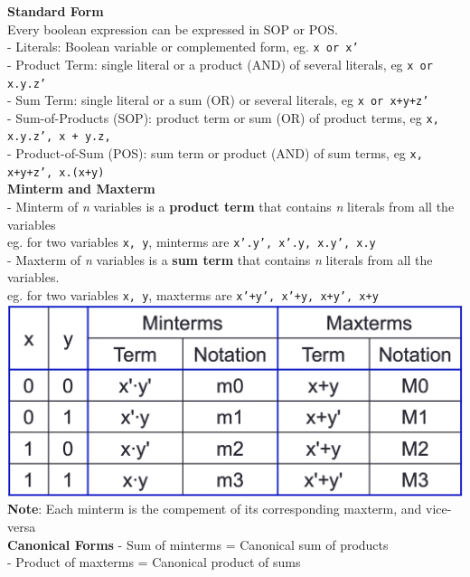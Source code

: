 \documentclass[10pt, a4paper]{article}
\newcommand{\highlight}[1]{{\color{red}\textbf{#1}}}
\begin{document}
\begin{multicols*}{3}
		\textbf{Standard Form}\\
		Every boolean expression can be expressed in SOP or POS.\\
		- Literals: Boolean variable or complemented form, eg. \texttt{x or x'}\\
		- Product Term: single literal or a product (AND) of several literals, eg \texttt{x or x.y.z'}\\
		- Sum Term: single literal or a sum (OR) or several literals, eg \texttt{x or x+y+z'}\\
		- Sum-of-Products (SOP): product term or sum (OR) of product terms, eg \texttt{x, x.y.z', x + y.z,}\\
		- Product-of-Sum (POS): sum term or product (AND) of sum terms, eg \texttt{x, x+y+z', x.(x+y)}\\
		
		\textbf{Minterm and Maxterm}\\
		- Minterm of \textit{n} variables is a \textbf{product term} that contains \textit{n} literals from all the variables\\
		eg. for two variables \texttt{x, y}, minterms are \texttt{x'.y', x'.y, x.y', x.y}\\
		- Maxterm of \textit{n} variables is a \textbf{sum term} that contains \textit{n} literals from all the variables.\\
		eg. for two variables \texttt{x, y}, maxterms are \texttt{x'+y', x'+y, x+y', x+y}\\
		
		\includegraphics[scale=.35]{./assets/mintermAndMaxterm}\\
		
		\highlight{Note}: Each minterm is the compement of its corresponding maxterm, and vice-versa\\
		
		\textbf{Canonical Forms}
		- Sum of minterms = Canonical sum of products\\
		- Product of maxterms = Canonical product of sums\\
		

\end{multicols*}
\end{document}
